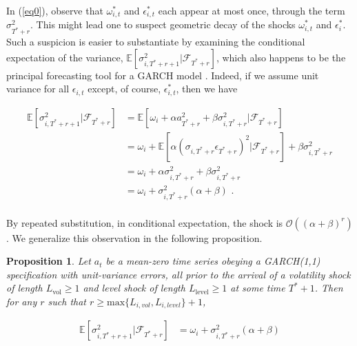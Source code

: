 \documentclass[11pt]{article}
\newtheorem{prop}{Proposition}
\theoremstyle{definition}
\begin{document}
In (\ref{eq0}), observe that $\omega_{i,t}^{*}$ and $\epsilon^{*}_{i,t}$ each appear at most once, through the term $\sigma^{2}_{T^{*}+r}$.  This might lead one to suspect  geometric decay of the shocks $\omega_{i,t}^{*}$ and $\epsilon^{*}_{i}$.  Such a suspicion is easier to substantiate by examining the conditional expectation of the variance, $\mathbb{E}[ \sigma^{2}_{i,T^{*}+r+1} |\mathcal{F}_{T^{*}+r}]$, which also happens to be the principal forecasting tool for a GARCH model \citep{zivot2009practical}.  Indeed, if we assume unit variance for all $\epsilon_{i,t}$ except, of course, $\epsilon^{*}_{i,t}$, then we have

\begin{align*}
\mathbb{E}[ \sigma^{2}_{i,T^{*}+r+1} |\mathcal{F}_{T^{*}+r}] & = \mathbb{E}[\omega_{i} + \alpha a_{T^{*}+r}^{2} + \beta\sigma^{2}_{i,T^{*}+r} |\mathcal{F}_{T^{*}+r}] \\
& = \omega_{i} + \mathbb{E}[\alpha(\sigma_{i,T^{*}+r}\epsilon_{T^{*}+r})^{2} |\mathcal{F}_{T^{*}+r}] + \beta\sigma^{2}_{i,T^{*}+r} \\
& = \omega_{i} + \alpha\sigma_{i,T^{*}+r}^{2} + \beta\sigma^{2}_{i,T^{*}+r} \tag{Due to the unit variance assumption}\\
& = \omega_{i} + \sigma^{2}_{i,T^{*}+r}(\alpha + \beta) \text{ .} \\
\end{align*}

By repeated substitution, in conditional expectation, the shock is $\mathcal{O}((\alpha+\beta)^{r})$.  We generalize this observation in the following proposition.

\begin{prop}
Let $a_{t}$ be a mean-zero time series obeying a GARCH(1,1) specification with unit-variance errors, all prior to the arrival of a volatility shock of length $L_{\text{vol}} \geq 1$ and level shock of length $L_{\text{level}}\geq 1$ at some time $T^{*}+1$.  Then for any $r$ such that $r \geq \text{max}\{L_{i, vol},L_{i, level}\} + 1$, 

\begin{align*}
\mathbb{E}[ \sigma^{2}_{i,T^{*}+r+1} |\mathcal{F}_{T^{*}+r}] & = \omega_{i} + \sigma^{2}_{i,T^{*}+r}(\alpha + \beta)
\end{align*}
\end{prop}
\end{document}
